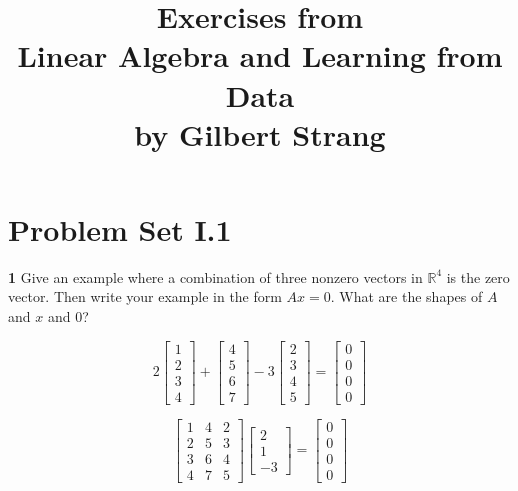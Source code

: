 \documentclass{article}
\title{Exercises from \\
  Linear Algebra and Learning from Data\\
  by Gilbert Strang
}
\begin{document}
\maketitle

\section*{Problem Set I.1}

\noindent\textbf{1} Give an example where a combination of three nonzero vectors in $\mathbb{R}^4$ is the zero 
vector. Then write your example in the form $Ax = 0$. What are the shapes of $A$ and
$x$ and 0?

\begin{displaymath}
2 \begin{bmatrix} 1 \\ 2 \\ 3 \\ 4 \end{bmatrix}
+ \begin{bmatrix} 4 \\ 5 \\ 6 \\ 7 \end{bmatrix}
- 3 \begin{bmatrix} 2 \\ 3 \\ 4 \\ 5 \end{bmatrix}
= \begin{bmatrix} 0 \\ 0 \\ 0 \\ 0 \end{bmatrix}
\end{displaymath}

\begin{displaymath}
\begin{bmatrix} 1 & 4 & 2 \\ 2 & 5 & 3 \\ 3 & 6 & 4 \\ 4 & 7 & 5 \end{bmatrix}
\begin{bmatrix} 2 \\ 1 \\ -3 \end{bmatrix}
= \begin{bmatrix} 0 \\ 0 \\ 0 \\ 0 \end{bmatrix}
\end{displaymath}
\end{document}
